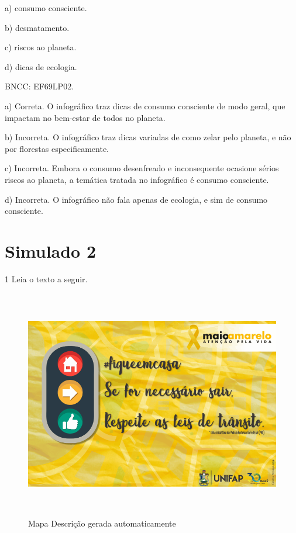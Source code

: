 a) consumo consciente.

b) desmatamento.

c) riscos ao planeta.

d) dicas de ecologia.

BNCC: EF69LP02.

a) Correta. O infográfico traz dicas de consumo consciente de modo
geral, que impactam no bem-estar de todos no planeta.

b) Incorreta. O infográfico traz dicas variadas de como zelar pelo
planeta, e não por florestas especificamente.

c) Incorreta. Embora o consumo desenfreado e inconsequente ocasione
sérios riscos ao planeta, a temática tratada no infográfico é consumo
consciente.

d) Incorreta. O infográfico não fala apenas de ecologia, e sim de
consumo consciente.


\section{Simulado 2}

\num{1} Leia o texto a seguir.

\begin{figure}
\centering
\includegraphics[width=5.90556in,height=3.95694in]{./imgSAEB_6_POR/media/image38.png}
\caption{Mapa Descrição gerada automaticamente}
\end{figure}


